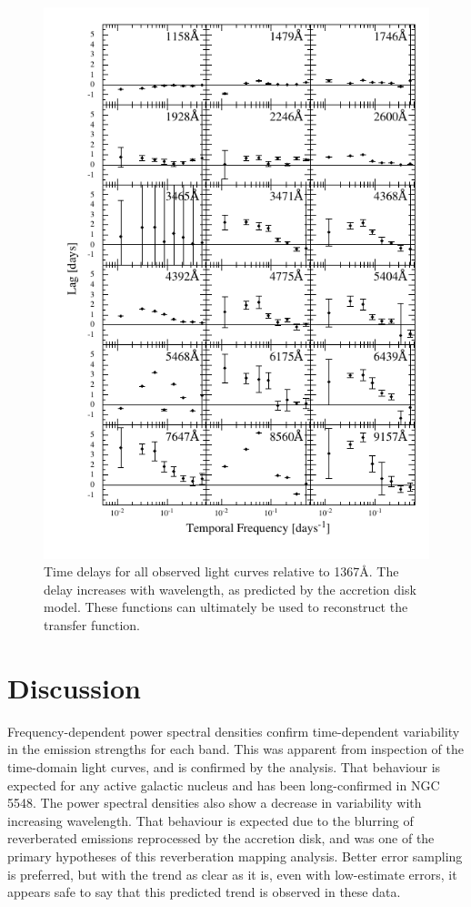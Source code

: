 \documentclass[11pt,letterpaper]{article}
\begin{document}
    \begin{figure}
        \centering
        \includegraphics[width=.9\textwidth]{../img/timelag_atlas.pdf}
        \caption{Time delays for all observed light curves relative to 1367\AA. The delay increases with wavelength, as predicted by the accretion disk model. These functions can ultimately be used to reconstruct the transfer function.}
        \label{timelag_atlas}
    \end{figure}

\section{Discussion}

Frequency-dependent power spectral densities confirm time-dependent variability in the emission strengths for each band. This was apparent from inspection of the time-domain light curves, and is confirmed by the analysis. That behaviour is expected for any active galactic nucleus and has been long-confirmed in NGC 5548. The power spectral densities also show a decrease in variability with increasing wavelength. That behaviour is expected due to the blurring of reverberated emissions reprocessed by the accretion disk, and was one of the primary hypotheses of this reverberation mapping analysis. Better error sampling is preferred, but with the trend as clear as it is, even with low-estimate errors, it appears safe to say that this predicted trend is observed in these data.
\end{document}

